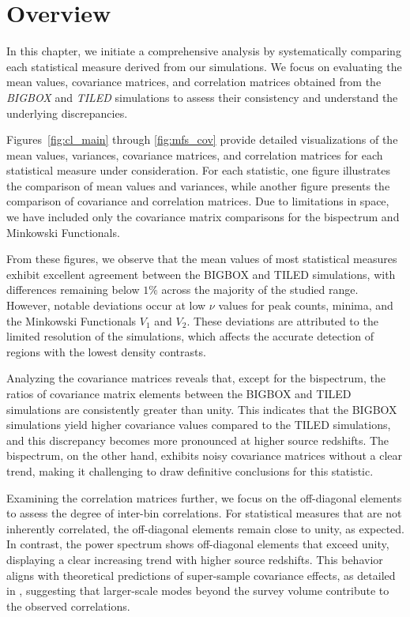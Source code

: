 \section{Overview}
In this chapter, we initiate a comprehensive analysis by systematically comparing each statistical measure derived from our simulations. We focus on evaluating the mean values, covariance matrices, and correlation matrices obtained from the \emph{BIGBOX} and \emph{TILED} simulations to assess their consistency and understand the underlying discrepancies.

Figures~\ref{fig:cl_main} through \ref{fig:mfs_cov} provide detailed visualizations of the mean values, variances, covariance matrices, and correlation matrices for each statistical measure under consideration. For each statistic, one figure illustrates the comparison of mean values and variances, while another figure presents the comparison of covariance and correlation matrices. Due to limitations in space, we have included only the covariance matrix comparisons for the bispectrum and Minkowski Functionals.

From these figures, we observe that the mean values of most statistical measures exhibit excellent agreement between the BIGBOX and TILED simulations, with differences remaining below $1\%$ across the majority of the studied range. However, notable deviations occur at low $\nu$ values for peak counts, minima, and the Minkowski Functionals $V_1$ and $V_2$. These deviations are attributed to the limited resolution of the simulations, which affects the accurate detection of regions with the lowest density contrasts.

Analyzing the covariance matrices reveals that, except for the bispectrum, the ratios of covariance matrix elements between the BIGBOX and TILED simulations are consistently greater than unity. This indicates that the BIGBOX simulations yield higher covariance values compared to the TILED simulations, and this discrepancy becomes more pronounced at higher source redshifts. The bispectrum, on the other hand, exhibits noisy covariance matrices without a clear trend, making it challenging to draw definitive conclusions for this statistic.

Examining the correlation matrices further, we focus on the off-diagonal elements to assess the degree of inter-bin correlations. For statistical measures that are not inherently correlated, the off-diagonal elements remain close to unity, as expected. In contrast, the power spectrum shows off-diagonal elements that exceed unity, displaying a clear increasing trend with higher source redshifts. This behavior aligns with theoretical predictions of super-sample covariance effects, as detailed in \citet{PhysRevD.87.123504}, suggesting that larger-scale modes beyond the survey volume contribute to the observed correlations.

